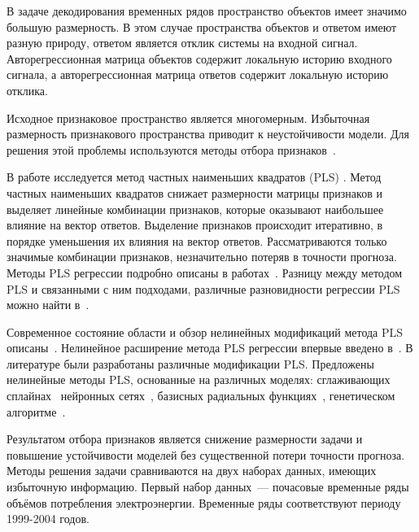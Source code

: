 \documentclass[12pt,twoside]{article}
\begin{document}
В задаче декодирования временных рядов пространство объектов имеет значимо большую размерность. В этом случае пространства объектов и ответом имеют разную природу, ответом является отклик системы на входной сигнал. Авторегрессионная матрица объектов содержит локальную историю входного сигнала, а авторегрессионная матрица ответов содержит локальную историю отклика.

Исходное признаковое пространство является многомерным. Избыточная размерность признакового пространства приводит к неустойчивости модели.
Для решения этой проблемы используются методы отбора признаков~\cite{katrutsa2015qpfs,li2016feature}.

В работе исследуется метод частных наименьших квадратов (PLS) \cite{wegelin2000survey,abdi2003pls,geladi1986partial}.
Метод частных наименьших квадратов снижает размерности матрицы признаков и выделяет линейные комбинации признаков, которые оказывают наибольшее влияние на вектор ответов. 
Выделение признаков происходит итеративно, в порядке уменьшения их влияния на вектор ответов. Рассматриваются только значимые комбинации признаков, незначительно потеряв в точности прогноза. 
Методы PLS регрессии подробно описаны в работах~\cite{geladi1988pls, hoskuldsson1988plsr,de1993simpls}. 
Разницу между методом PLS и связанными с ним подходами, различные разновидности регрессии PLS можно найти в~\cite{rosipal2006overview}.

Современное состояние области и обзор нелинейных модификаций метода PLS описаны~\cite{rosipal2011npls}.
Нелинейное расширение метода PLS регрессии впервые введено в~\cite{wold1989nonlinear}. 
В литературе были разработаны различные модификации PLS. 
Предложены нелинейные методы PLS, основанные на различных моделях: 
сглаживающих сплайнах~\cite{frank1990npls} нейронных сетях~\cite{qin1992npls}, базисных радиальных функциях~\cite{yan2003geneticpls}, генетическом алгоритме~\cite{hiden1998geneticpls}. 

Результатом отбора признаков является снижение размерности задачи и повышение устойчивости моделей без существенной потери точности прогноза.
Методы решения задачи сравниваются на двух наборах данных, имеющих избыточную информацию. 
Первый набор данных~--- почасовые временные ряды объёмов потребления электроэнергии. Временные ряды соответствуют периоду 1999-2004 годов. 
\end{document}
